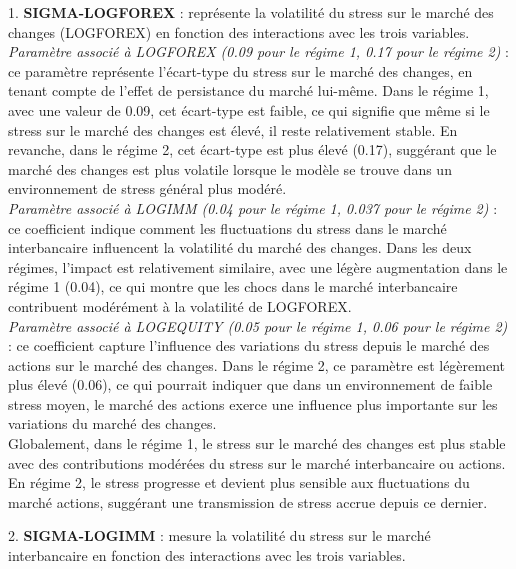 1. \textbf{SIGMA-LOGFOREX} : représente la volatilité du stress sur le marché des changes (LOGFOREX) en fonction des interactions avec les trois variables.\\

\textit{Paramètre associé à LOGFOREX (0.09 pour le régime 1, 0.17 pour le régime 2)} : ce paramètre représente l’écart-type du stress sur le marché des changes, en tenant compte de l’effet de persistance du marché lui-même. Dans le régime 1, avec une valeur de 0.09, cet écart-type est faible, ce qui signifie que même si le stress sur le marché des changes est élevé, il reste relativement stable. En revanche, dans le régime 2, cet écart-type est plus élevé (0.17), suggérant que le marché des changes est plus volatile lorsque le modèle se trouve dans un environnement de stress général plus modéré.\\

\textit{Paramètre associé à LOGIMM (0.04 pour le régime 1, 0.037 pour le régime 2)} : ce coefficient indique comment les fluctuations du stress dans le marché interbancaire influencent la volatilité du marché des changes. Dans les deux régimes, l’impact est relativement similaire, avec une légère augmentation dans le régime 1 (0.04), ce qui montre que les chocs dans le marché interbancaire contribuent modérément à la volatilité de LOGFOREX.\\

\textit{Paramètre associé à LOGEQUITY (0.05 pour le régime 1, 0.06 pour le régime 2)} : ce coefficient capture l’influence des variations du stress depuis le marché des actions sur le marché des changes. Dans le régime 2, ce paramètre est légèrement plus élevé (0.06), ce qui pourrait indiquer que dans un environnement de faible stress moyen, le marché des actions exerce une influence plus importante sur les variations du marché des changes.\\

Globalement, dans le régime 1, le stress sur le marché des changes est plus stable avec des contributions modérées du stress sur le marché interbancaire ou actions. En régime 2, le stress progresse et devient plus sensible aux fluctuations du marché actions, suggérant une transmission de stress accrue depuis ce dernier.

\vspace{0.5cm}

2. \textbf{SIGMA-LOGIMM} : mesure la volatilité du stress sur le marché interbancaire en fonction des interactions avec les trois variables.\\

